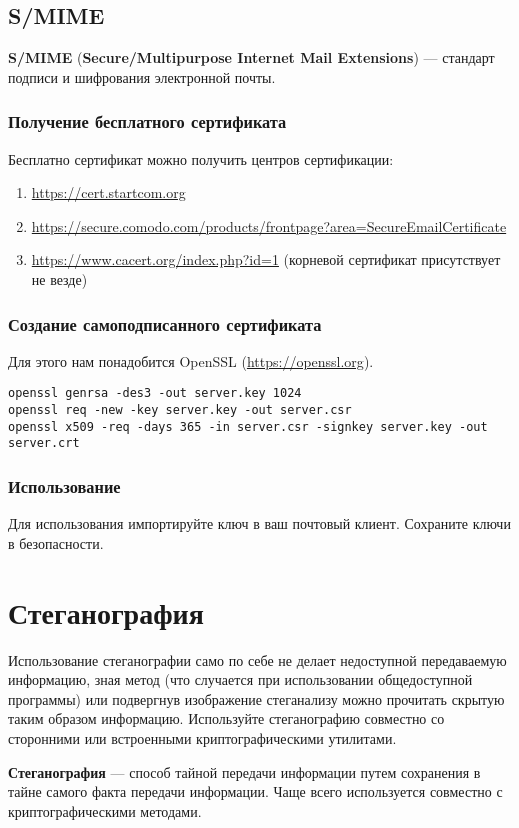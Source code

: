 \subsection{S/MIME}
\textbf{S/MIME} (\textbf{Secure/Multipurpose Internet Mail Extensions}) --- стандарт подписи и шифрования электронной почты.
\subsubsection{Получение бесплатного сертификата}
Бесплатно сертификат можно получить центров сертификации:
\begin{enumerate}
\item \url{https://cert.startcom.org}
\item \url{https://secure.comodo.com/products/frontpage?area=SecureEmailCertificate}
\item \url{https://www.cacert.org/index.php?id=1} (корневой сертификат присутствует не везде)
\end{enumerate}
\subsubsection{Создание самоподписанного сертификата}
Для этого нам понадобится OpenSSL (\url{https://openssl.org}).
\begin{lstlisting}
openssl genrsa -des3 -out server.key 1024
openssl req -new -key server.key -out server.csr
openssl x509 -req -days 365 -in server.csr -signkey server.key -out server.crt
\end{lstlisting}
\subsubsection{Использование}
Для использования импортируйте ключ в ваш почтовый клиент. Сохраните ключи в безопасности.

\section{Стеганография}
\begin{important}
Использование стеганографии само по себе не делает недоступной передаваемую информацию, зная метод (что случается при использовании общедоступной программы) или подвергнув изображение стеганализу можно прочитать скрытую таким образом информацию. Используйте стеганографию совместно со сторонними или встроенными криптографическими утилитами.
\end{important}
\textbf{Стеганография} --- способ тайной передачи информации путем сохранения в тайне самого факта передачи информации. Чаще всего используется совместно с криптографическими методами.
